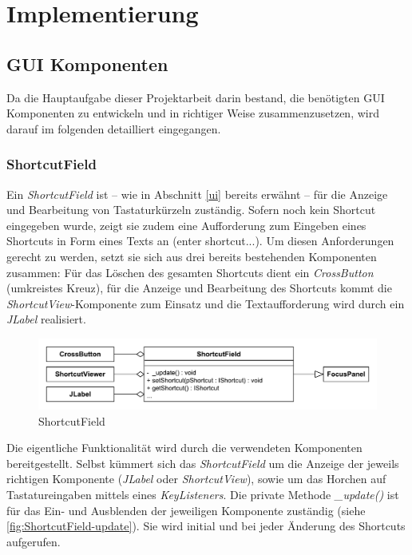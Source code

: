 \section{Implementierung}

\subsection{GUI Komponenten}

Da die Hauptaufgabe dieser Projektarbeit darin bestand, die benötigten GUI Komponenten zu entwickeln und in richtiger Weise zusammenzusetzen, wird darauf im folgenden detailliert eingegangen.

\subsubsection{ShortcutField}

Ein \emph{ShortcutField} ist -- wie in Abschnitt \ref{ui} bereits erwähnt -- für die Anzeige und Bearbeitung von Tastaturkürzeln zuständig. Sofern noch kein Shortcut eingegeben wurde, zeigt sie zudem eine Aufforderung zum Eingeben eines Shortcuts in Form eines Texts an (\glqq enter shortcut...\grqq). Um diesen Anforderungen gerecht zu werden, setzt sie sich aus drei bereits bestehenden Komponenten zusammen: Für das Löschen des gesamten Shortcuts dient ein \emph{CrossButton} (umkreistes Kreuz), für die Anzeige und Bearbeitung des Shortcuts kommt die \emph{ShortcutView}-Komponente zum Einsatz und die Textaufforderung wird durch ein \emph{JLabel} realisiert.

\begin{figure}[H]
	\centering
	\includegraphics[width=0.8\linewidth]{../graphic/diagrams/CD_ShortcutField/ShortcutField}
	\caption{ShortcutField}
	\label{fig:shortcutfield}
\end{figure}

Die eigentliche Funktionalität wird durch die verwendeten Komponenten bereitgestellt. Selbst kümmert sich das \emph{ShortcutField} um die Anzeige der jeweils richtigen Komponente (\emph{JLabel} oder \emph{ShortcutView}), sowie um das Horchen auf Tastatureingaben mittels eines \emph{KeyListeners}. Die private Methode \emph{\_update()} ist für das Ein- und Ausblenden der jeweiligen Komponente zuständig (siehe \autoref{fig:ShortcutField-update}). Sie wird initial und bei jeder Änderung des Shortcuts aufgerufen.

